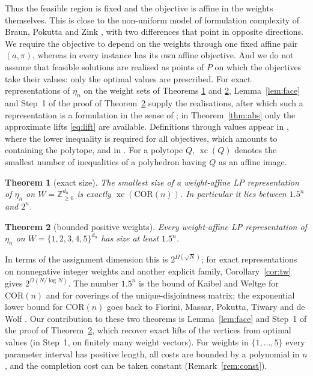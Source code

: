 \documentclass[11pt]{amsart}
\theoremstyle{plain}
\newtheorem{theorem}{Theorem}
\theoremstyle{definition}
\theoremstyle{remark}
\newcommand{\Z}{\mathbb{Z}}
\newcommand{\COR}{\mathrm{COR}}
\newcommand{\xc}{\operatorname{xc}}
\begin{document}
Thus the feasible region is fixed and the objective is affine in the weights themselves. This is close to the
non-uniform model of formulation complexity of Braun, Pokutta and Zink \cite{BPZ}, with two differences that point
in opposite directions. We require the objective to depend on the weights through one fixed affine pair $(a,\pi)$,
whereas in \cite{BPZ} every instance has its own affine objective. And we do not assume that feasible solutions are
realised as points of $P$ on which the objectives take their values: only the optimal values are prescribed.
For exact representations of $\eta_n$ on the weight sets of Theorems \ref{thm:exact} and \ref{thm:bounded},
Lemma~\ref{lem:face} and Step~1 of the proof of Theorem~\ref{thm:bounded} supply the realisations, after which such
a representation is a formulation in the sense of \cite{BPZ}; in Theorem~\ref{thm:abs} only the approximate lifts
\eqref{eq:lift} are available. Definitions through values appear in
\cite[Section~2.2]{BFPS}, where the lower inequality is required for all objectives, which amounts to containing
the polytope, and in \cite{HL}. For a polytope $Q$, $\xc(Q)$ denotes the smallest number of inequalities of a polyhedron having $Q$ as
an affine image.

\begin{theorem}[exact size]\label{thm:exact}
The smallest size of a weight-affine LP representation of $\eta_n$ on $W=\Z^{d_n}_{\ge0}$ is exactly
$\xc(\COR(n))$. In particular it lies between $1.5^n$ and $2^n$.
\end{theorem}

\begin{theorem}[bounded positive weights]\label{thm:bounded}
Every weight-affine LP representation of $\eta_n$ on $W=\{1,2,3,4,5\}^{d_n}$ has size at least $1.5^n$.
\end{theorem}

In terms of the assignment dimension this is $2^{\Omega(\sqrt N)}$; for exact representations on nonnegative
integer weights and another explicit family, Corollary~\ref{cor:tw} gives $2^{\Omega(N/\log N)}$. The number $1.5^n$ is the
bound of Kaibel and Weltge \cite{KW} for $\COR(n)$ and for coverings of the unique-disjointness matrix; the
exponential lower bound for $\COR(n)$ goes back to Fiorini, Massar, Pokutta, Tiwary and de Wolf \cite{FMPTW}. Our
contribution to these two theorems is Lemma~\ref{lem:face} and Step~1 of the proof of Theorem~\ref{thm:bounded},
which recover exact lifts of the vertices from optimal values (in Step~1, on finitely many weight vectors). For weights in
$\{1,\dots,5\}$ every parameter interval has positive length, all costs are bounded by a polynomial in $n$, and the
completion cost can be taken constant (Remark~\ref{rem:const}).
\end{document}
